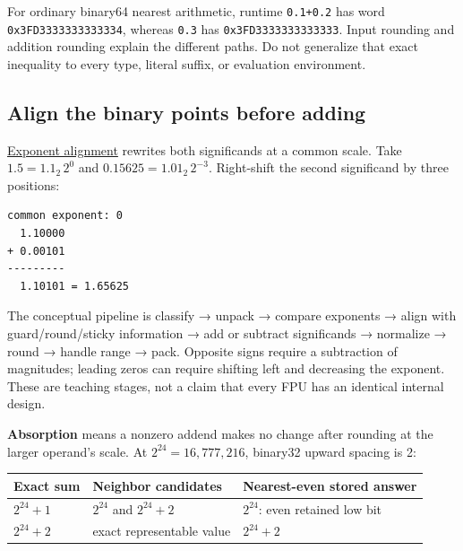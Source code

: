For ordinary binary64 nearest arithmetic, runtime \texttt{0.1+0.2} has word \texttt{0x3FD3333333333334}, whereas \texttt{0.3} has \texttt{0x3FD3333333333333}. Input rounding and addition rounding explain the different paths. Do not generalize that exact inequality to every type, literal suffix, or evaluation environment.

\subsection{Align the binary points before adding}\label{01-foundations-i-ch001-align-the-binary-points-before-adding}

\hyperref[appendix-a1b1b4580dfd]{Exponent alignment} rewrites both significands at a common scale. Take \(1.5=1.1_2\,2^0\) and \(0.15625=1.01_2\,2^{-3}\). Right-shift the second significand by three positions:

\begin{verbatim}
common exponent: 0
  1.10000
+ 0.00101
---------
  1.10101 = 1.65625
\end{verbatim}

The conceptual pipeline is classify → unpack → compare exponents → align with guard/round/sticky information → add or subtract significands → normalize → round → handle range → pack. Opposite signs require a subtraction of magnitudes; leading zeros can require shifting left and decreasing the exponent. These are teaching stages, not a claim that every FPU has an identical internal design.

\textbf{Absorption} means a nonzero addend makes no change after rounding at the larger operand's scale. At \(2^{24}=16{,}777{,}216\), binary32 upward spacing is 2:

{\def\LTcaptype{none} %
\begin{longtable}[]{@{}
  >{\raggedright\arraybackslash}p{}
  >{\raggedright\arraybackslash}p{}
  >{\raggedright\arraybackslash}p{}@{}}
\toprule\noalign{}
\begin{minipage}[b]{\linewidth}\raggedright
Exact sum
\end{minipage} & \begin{minipage}[b]{\linewidth}\raggedright
Neighbor candidates
\end{minipage} & \begin{minipage}[b]{\linewidth}\raggedright
Nearest-even stored answer
\end{minipage} \\
\midrule\noalign{}
\endhead
\bottomrule\noalign{}
\endlastfoot
\(2^{24}+1\) & \(2^{24}\) and \(2^{24}+2\) & \(2^{24}\): even retained low bit \\
\(2^{24}+2\) & exact representable value & \(2^{24}+2\) \\
\end{longtable}
}

